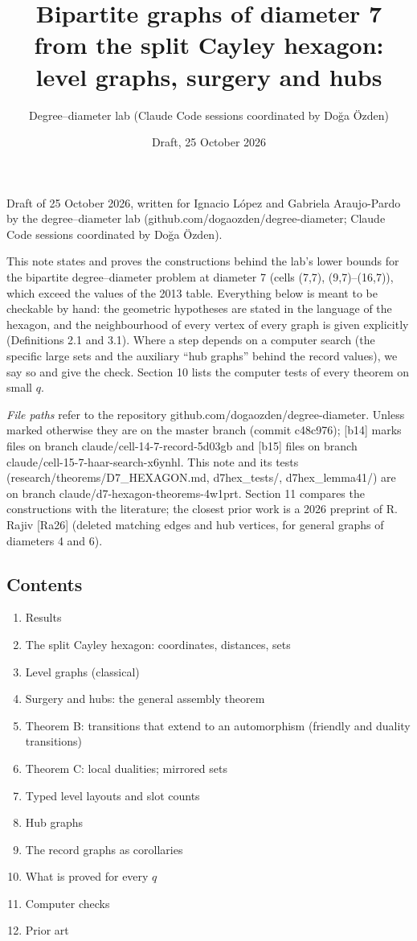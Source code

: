 \documentclass[
  11pt,
]{article}
\title{Bipartite graphs of diameter 7 from the split Cayley hexagon: level graphs, surgery and hubs}
\author{Degree--diameter lab (Claude Code sessions coordinated by Doğa Özden)}
\date{Draft, 25 October 2026}
\providecommand{\tightlist}{%
  \setlength{\itemsep}{0pt}\setlength{\parskip}{0pt}}
\begin{document}
\maketitle

Draft of 25 October 2026, written for Ignacio López and Gabriela Araujo-Pardo by the degree--diameter lab
(github.com/dogaozden/degree-diameter; Claude Code sessions coordinated by Doğa Özden).

This note states and proves the constructions behind the lab's lower bounds for the bipartite degree--diameter problem
at diameter 7 (cells (7,7), (9,7)--(16,7)), which exceed the values of the 2013 table. Everything below is meant to be
checkable by hand: the geometric hypotheses are stated in the language of the hexagon, and the neighbourhood of every
vertex of every graph is given explicitly (Definitions 2.1 and 3.1). Where a step depends on a computer search (the
specific large sets and the auxiliary ``hub graphs'' behind the record values), we say so and give the check. Section 10
lists the computer tests of every theorem on small \(q\).

\emph{File paths} refer to the repository github.com/dogaozden/degree-diameter. Unless marked otherwise they are on the
master branch (commit c48c976); {[}b14{]} marks files on branch claude/cell-14-7-record-5d03gb and {[}b15{]} files on
branch claude/cell-15-7-haar-search-x6ynhl. This note and its tests (research/theorems/D7\_HEXAGON.md, d7hex\_tests/,
d7hex\_lemma41/) are on branch claude/d7-hexagon-theorems-4w1prt. Section 11 compares the constructions with the
literature; the closest prior work is a 2026 preprint of R. Rajiv {[}Ra26{]} (deleted matching edges and hub vertices,
for general graphs of diameters 4 and 6).

\hypertarget{contents}{%
\subsection{Contents}\label{contents}}

\begin{enumerate}
\def\labelenumi{\arabic{enumi}.}
\setcounter{enumi}{-1}
\tightlist
\item
  Results
\item
  The split Cayley hexagon: coordinates, distances, sets
\item
  Level graphs (classical)
\item
  Surgery and hubs: the general assembly theorem
\item
  Theorem B: transitions that extend to an automorphism (friendly and duality transitions)
\item
  Theorem C: local dualities; mirrored sets
\item
  Typed level layouts and slot counts
\item
  Hub graphs
\item
  The record graphs as corollaries
\item
  What is proved for every \(q\)
\item
  Computer checks
\item
  Prior art
\end{enumerate}
\end{document}
